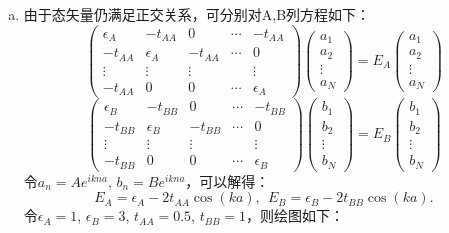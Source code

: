 \documentclass[reqno,a4paper,12pt]{amsart}
\begin{document}
\begin{tcolorbox}[breakable, colback = black!5!white, colframe = black]
\begin{enumerate}[(a)]
\item 由于态矢量仍满足正交关系，可分别对A,B列方程如下：
\[
	\begin{pmatrix}
		\epsilon_A & -t_{AA} & 0 & \cdots & -t_{AA} \\
		-t_{AA} & \epsilon_A & -t_{AA} & \cdots & 0 \\
		\vdots & \vdots & \vdots & & \vdots \\
		-t_{AA} & 0 & 0 & \cdots & \epsilon_A
	\end{pmatrix} \begin{pmatrix}
		a_1 \\
		a_2 \\
		\vdots \\
		a_N
	\end{pmatrix} = E_A\begin{pmatrix}
		a_1 \\
		a_2 \\
		\vdots \\
		a_N
	\end{pmatrix}
\]
\[
	\begin{pmatrix}
		\epsilon_B & -t_{BB} & 0 & \cdots & -t_{BB} \\
		-t_{BB} & \epsilon_B & -t_{BB} & \cdots & 0 \\
		\vdots & \vdots & \vdots & & \vdots \\
		-t_{BB} & 0 & 0 & \cdots & \epsilon_B
	\end{pmatrix} \begin{pmatrix}
		b_1 \\
		b_2 \\
		\vdots \\
		b_N
	\end{pmatrix} = E_B\begin{pmatrix}
		b_1 \\
		b_2 \\
		\vdots \\
		b_N
	\end{pmatrix}
\]
令$a_n = Ae^{ikna}$, $b_n = Be^{ikna}$，可以解得：
\[
	E_A = \epsilon_A - 2t_{AA}\cos(ka), ~~ E_B = \epsilon_B - 2t_{BB}\cos(ka).
\]
令$\epsilon_A = 1$, $\epsilon_B = 3$, $t_{AA} = 0.5$, $t_{BB} = 1$，则绘图如下： \\
\begin{centering}

\end{centering}
\end{enumerate}
\end{tcolorbox}
\end{document}
